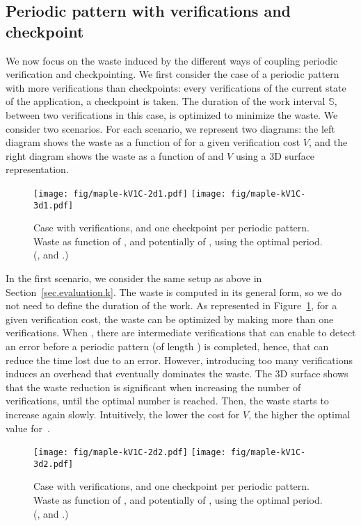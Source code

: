 \documentclass[10pt,table]{article}
\newcommand{\ema}[1]{\ensuremath{#1}\xspace}
\newcommand{\vvv}{\ema{V}}
\newcommand{\sss}{\ema{\mathbb{S}}}
\begin{document}
\subsection{Periodic pattern with  verifications and  checkpoint}
\label{sec.evaluation.kv1c}

We now focus on the waste induced by the different ways of coupling
periodic verification and checkpointing. We first consider the case of a
periodic pattern with more verifications than checkpoints: every 
verifications of the current state of the application, a
checkpoint is taken. The duration of the work interval \sss, between
two verifications in this case, is optimized to minimize the
waste. We consider two scenarios. For each scenario, we represent two diagrams: the left diagram
shows the waste as a function of  for a given verification cost \vvv,
and the right diagram shows the waste as a function of  and \vvv
using a 3D surface representation.

\begin{figure}
\begin{center}
\texttt{[image: fig/maple-kV1C-2d1.pdf]}
\texttt{[image: fig/maple-kV1C-3d1.pdf]}
\caption{Case with  verifications, and one checkpoint per
periodic  pattern. Waste as function of , and potentially of ,
using the optimal period.
\footnotesize{(, and .)}
\vspace{-2\baselineskip}
\label{fig:maple:kV1C1}}
\end{center}
\end{figure}

In the first scenario, we consider the same setup as above in
Section~\ref{sec.evaluation.k}.  The waste is computed in its general
form, so we do not need to define the duration of the work. As
represented in Figure~\ref{fig:maple:kV1C1}, for a given verification
cost, the waste can be optimized by making more than one 
verifications. When , there are intermediate verifications that
can enable to detect an error before a periodic pattern (of length
) is completed, hence, that can reduce the time lost due to an
error.
However, introducing
too many verifications induces an overhead that eventually dominates the
waste. The 3D surface shows that the waste reduction is significant
when increasing the number of verifications, until the optimal number
is reached. Then, the waste starts to increase again
slowly. Intuitively, the lower the cost for \vvv, the higher the
optimal value for~.

\begin{figure}
\begin{center}
\texttt{[image: fig/maple-kV1C-2d2.pdf]}
\texttt{[image: fig/maple-kV1C-3d2.pdf]}
\caption{Case with  verifications, and one checkpoint per
  periodic  pattern. Waste as function of , and potentially of ,
  using the optimal period.
  \footnotesize{(, and .)}
\label{fig:maple:kV1C2}\vspace{-1\baselineskip}}
\end{center}
\end{figure}
\end{document}
